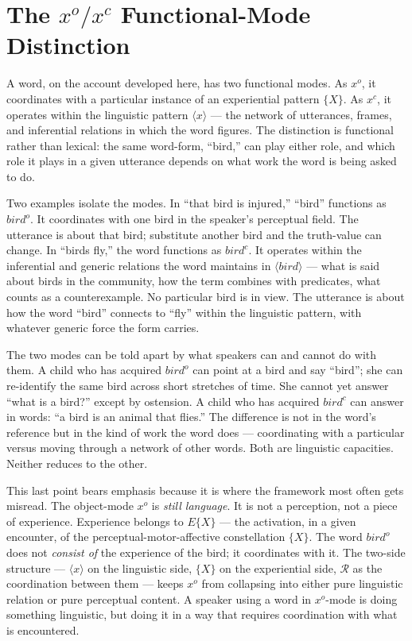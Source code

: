 \documentclass[10pt]{article}
\begin{document}
\section{\texorpdfstring{The \(x^o/x^c\) Functional-Mode Distinction}{The x\^{}o/x\^{}c Functional-Mode Distinction}}\label{the-xoxc-functional-mode-distinction}

A word, on the account developed here, has two functional modes. As \(x^o\), it coordinates with a particular instance of an experiential pattern \(\{X\}\). As \(x^c\), it operates within the linguistic pattern \(\langle x \rangle\) --- the network of utterances, frames, and inferential relations in which the word figures. The distinction is functional rather than lexical: the same word-form, ``bird,'' can play either role, and which role it plays in a given utterance depends on what work the word is being asked to do.

Two examples isolate the modes. In ``that bird is injured,'' ``bird'' functions as \(bird^o\). It coordinates with one bird in the speaker's perceptual field. The utterance is about that bird; substitute another bird and the truth-value can change. In ``birds fly,'' the word functions as \(bird^c\). It operates within the inferential and generic relations the word maintains in \(\langle bird \rangle\) --- what is said about birds in the community, how the term combines with predicates, what counts as a counterexample. No particular bird is in view. The utterance is about how the word ``bird'' connects to ``fly'' within the linguistic pattern, with whatever generic force the form carries.

The two modes can be told apart by what speakers can and cannot do with them. A child who has acquired \(bird^o\) can point at a bird and say ``bird''; she can re-identify the same bird across short stretches of time. She cannot yet answer ``what is a bird?'' except by ostension. A child who has acquired \(bird^c\) can answer in words: ``a bird is an animal that flies.'' The difference is not in the word's reference but in the kind of work the word does --- coordinating with a particular versus moving through a network of other words. Both are linguistic capacities. Neither reduces to the other.

This last point bears emphasis because it is where the framework most often gets misread. The object-mode \(x^o\) is \emph{still language}. It is not a perception, not a piece of experience. Experience belongs to \(E\{X\}\) --- the activation, in a given encounter, of the perceptual-motor-affective constellation \(\{X\}\). The word \(bird^o\) does not \emph{consist of} the experience of the bird; it coordinates with it. The two-side structure --- \(\langle x \rangle\) on the linguistic side, \(\{X\}\) on the experiential side, \(\mathcal{R}\) as the coordination between them --- keeps \(x^o\) from collapsing into either pure linguistic relation or pure perceptual content. A speaker using a word in \(x^o\)-mode is doing something linguistic, but doing it in a way that requires coordination with what is encountered.
\end{document}
